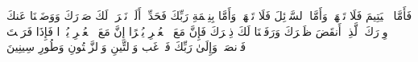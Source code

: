 \stopbuffer%
\startbuffer[\q:93:9]
فَأَمَّا ٱلۡیَتِیمَ فَلَا تَقۡهَرۡ%
\stopbuffer%
\startbuffer[\q:93:10]
وَأَمَّا ٱلسَّاۤئِلَ فَلَا تَنۡهَرۡ%
\stopbuffer%
\startbuffer[\q:93:11]
وَأَمَّا بِنِعۡمَةِ رَبِّكَ فَحَدِّثۡ%
\stopbuffer%
\startbuffer[\q:94:1]
أَلَمۡ نَشۡرَحۡ لَكَ صَدۡرَكَ%
\stopbuffer%
\startbuffer[\q:94:2]
وَوَضَعۡنَا عَنكَ وِزۡرَكَ%
\stopbuffer%
\startbuffer[\q:94:3]
ٱلَّذِیۤ أَنقَضَ ظَهۡرَكَ%
\stopbuffer%
\startbuffer[\q:94:4]
وَرَفَعۡنَا لَكَ ذِكۡرَكَ%
\stopbuffer%
\startbuffer[\q:94:5]
فَإِنَّ مَعَ ٱلۡعُسۡرِ یُسۡرًا%
\stopbuffer%
\startbuffer[\q:94:6]
إِنَّ مَعَ ٱلۡعُسۡرِ یُسۡرࣰا%
\stopbuffer%
\startbuffer[\q:94:7]
فَإِذَا فَرَغۡتَ فَٱنصَبۡ%
\stopbuffer%
\startbuffer[\q:94:8]
وَإِلَىٰ رَبِّكَ فَٱرۡغَب%
\stopbuffer%
\startbuffer[\q:95:1]
وَٱلتِّینِ وَٱلزَّیۡتُونِ%
\stopbuffer%
\startbuffer[\q:95:2]
وَطُورِ سِینِینَ%
\stopbuffer%
